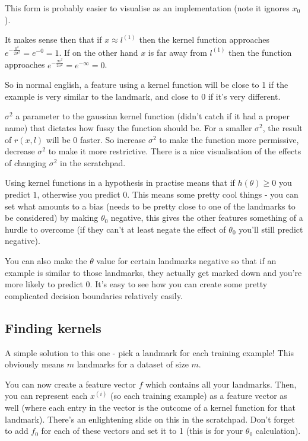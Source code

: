 This form is probably easier to visualise as an implementation (note it ignores $x_0$).

It makes sense then that if $x \approx l^{(1)}$ then the kernel function approaches $e^{-\frac{0^2}{2\sigma^2}} = e^{-0} = 1$. If on the other hand $x$ is far away from $l^{(1)}$ then the function approaches $e^{-\frac{\infty^2}{2\sigma^2}} = e^{-\infty} = 0$.

So in normal english, a feature using a kernel function will be close to 1 if the example is very similar to the landmark, and close to 0 if it's very different.

$\sigma^2$ a parameter to the gaussian kernel function (didn't catch if it had a proper name) that dictates how fussy the function should be. For a smaller $\sigma^2$, the result of $r(x,l)$ will be 0 faster. So increase $\sigma^2$ to make the function more permissive, decrease $\sigma^2$ to make it more restrictive. There is a nice visualisation of the effects of changing $\sigma^2$ in the scratchpad.

Using kernel functions in a hypothesis in practise means that if $h(\theta) \geq 0$ you predict $1$, otherwise you predict $0$. This means some pretty cool things - you can set what amounts to a bias (needs to be pretty close to one of the landmarks to be considered) by making $\theta_0$ negative, this gives the other features something of a hurdle to overcome (if they can't at least negate the effect of $\theta_0$ you'll still predict negative).

You can also make the $\theta$ value for certain landmarks negative so that if an example is similar to those landmarks, they actually get marked down and you're more likely to predict $0$. It's easy to see how you can create some pretty complicated decision boundaries relatively easily.

\subsection{Finding kernels}

A simple solution to this one - pick a landmark for each training example! This obviously means $m$ landmarks for a dataset of size $m$.

You can now create a feature vector $f$ which contains all your landmarks. Then, you can represent each $x^{(i)}$ (so each training example) as a feature vector as well (where each entry in the vector is the outcome of a kernel function for that landmark). There's an enlightening slide on this in the scratchpad. Don't forget to add $f_0$ for each of these vectors  and set it to 1 (this is for your $\theta_0$ calculation).

